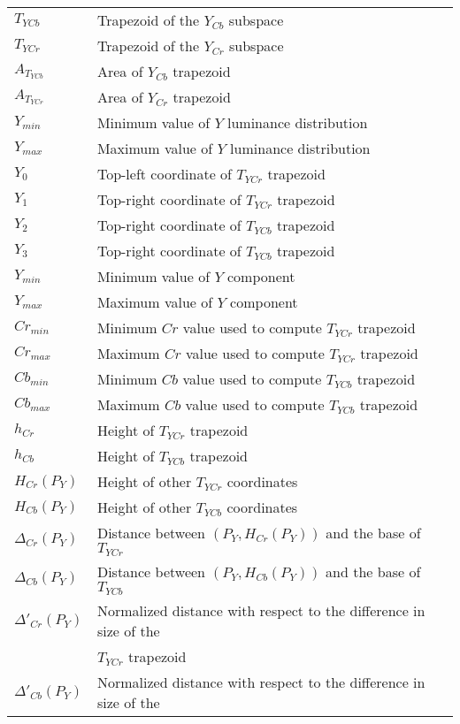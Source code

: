 \documentclass[12pt,twoside,a4paper]{book}
\theoremstyle{plain}
\theoremstyle{definition}
\begin{document}
\clearpage
\begin{tabular}{ll}
    $T_{YCb}$   & Trapezoid of the $Y_{Cb}$ subspace \\
    $T_{YCr}$   & Trapezoid of the $Y_{Cr}$ subspace \\
    $A_{T_{YCb}}$& Area of $Y_{Cb}$ trapezoid \\
    $A_{T_{YCr}}$& Area of $Y_{Cr}$ trapezoid \\
    $Y_{min}$   & Minimum value of $Y$ luminance distribution \\
    $Y_{max}$   & Maximum value of $Y$ luminance distribution \\
    $Y_{0}$     & Top-left coordinate of $T_{YCr}$ trapezoid \\
    $Y_{1}$     & Top-right coordinate of $T_{YCr}$ trapezoid \\
    $Y_{2}$     & Top-right coordinate of $T_{YCb}$ trapezoid \\
    $Y_{3}$     & Top-right coordinate of $T_{YCb}$ trapezoid \\
    $Y_{min}$   & Minimum value of $Y$ component \\
    $Y_{max}$   & Maximum value of $Y$ component \\
    $Cr_{min}$  & Minimum $Cr$ value used to compute $T_{YCr}$ trapezoid \\
    $Cr_{max}$  & Maximum $Cr$ value used to compute $T_{YCr}$ trapezoid \\
    $Cb_{min}$  & Minimum $Cb$ value used to compute $T_{YCb}$ trapezoid \\
    $Cb_{max}$  & Maximum $Cb$ value used to compute $T_{YCb}$ trapezoid \\
    $h_{Cr}$    & Height of $T_{YCr}$ trapezoid \\
    $h_{Cb}$    & Height of $T_{YCb}$ trapezoid \\
    $H_{Cr}(P_Y)$& Height of other $T_{YCr}$ coordinates \\
    $H_{Cb}(P_Y)$& Height of other $T_{YCb}$ coordinates \\
    $\Delta_{Cr}(P_Y)$& Distance between $(P_Y, H_{Cr}(P_Y))$ and the base of $T_{YCr}$ \\
    $\Delta_{Cb}(P_Y)$& Distance between $(P_Y, H_{Cb}(P_Y))$ and the base of $T_{YCb}$ \\
    $\Delta'_{Cr}(P_Y)$& Normalized distance with respect to the difference in size of the \\
                       &$T_{YCr}$ trapezoid \\
    $\Delta'_{Cb}(P_Y)$& Normalized distance with respect to the difference in size of the \\

\end{tabular}
\end{document}
